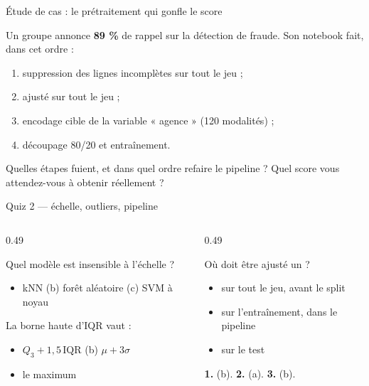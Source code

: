 \begin{frame}{Étude de cas : le prétraitement qui gonfle le score}
\begin{wbox}[La situation]
Un groupe annonce \textbf{89 \%} de rappel sur la détection de fraude. Son
notebook fait, dans cet ordre :
\begin{enumerate}
  \item suppression des lignes incomplètes sur tout le jeu ;
  \item {} ajusté sur tout le jeu ;
  \item encodage cible de la variable « agence » (120 modalités) ;
  \item découpage 80/20 et entraînement.
\end{enumerate}
\end{wbox}
\vspace{1mm}
\begin{abox}
Quelles étapes fuient, et dans quel ordre refaire le pipeline ?
Quel score vous attendez-vous à obtenir réellement ?
\end{abox}
\end{frame}

\begin{frame}{Quiz 2 --- échelle, outliers, pipeline}
\begin{columns}[t]
\begin{column}{0.49\textwidth}
\begin{qbox}[Question 1]
Quel modèle est insensible à l'échelle ?
\begin{itemize}
  \item[(a)] kNN \quad (b) forêt aléatoire \quad (c) SVM à noyau
\end{itemize}
\end{qbox}
\begin{qbox}[Question 2]
La borne haute d'IQR vaut :
\begin{itemize}
  \item[(a)] $Q_3 + 1{,}5\,\mathrm{IQR}$ \quad (b) $\mu + 3\sigma$
  \item[(c)] le maximum
\end{itemize}
\end{qbox}
\end{column}
\begin{column}{0.49\textwidth}
\begin{qbox}[Question 3]
Où doit être ajusté un  ?
\begin{itemize}
  \item[(a)] sur tout le jeu, avant le split
  \item[(b)] sur l'entraînement, dans le pipeline
  \item[(c)] sur le test
\end{itemize}
\end{qbox}
\begin{solbox}[Réponses]
\textbf{1.} (b). \quad \textbf{2.} (a). \quad \textbf{3.} (b).
\end{solbox}
\end{column}
\end{columns}
\end{frame}

